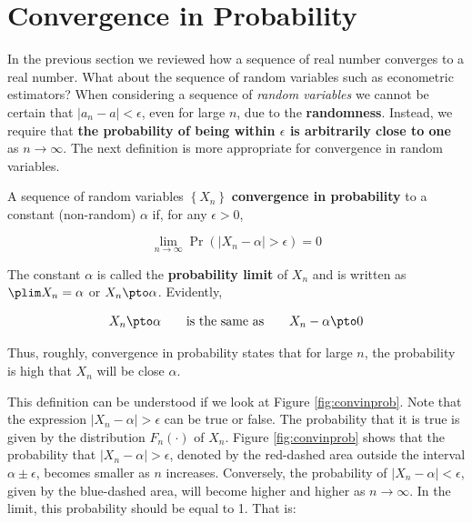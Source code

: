 \documentclass[english,12pt]{book}\usepackage[]{graphicx}\usepackage[]{xcolor}
\begin{document}
\section{Convergence in Probability}

In the previous section we reviewed how a sequence of real number converges to a real number.  What about the sequence of random variables such as econometric estimators? When considering a sequence of \emph{random variables} we cannot be certain that $\left| a_n - a\right|<\epsilon$, even for large $n$, due to the \textbf{randomness}. Instead, we require that \textbf{the probability of being within $\epsilon$ is arbitrarily close to one} as $n\to \infty$. The next definition is more appropriate for convergence in random variables. 

\begin{definition}\label{definition:convergence_in_probability}
	A sequence of random variables $\left\{X_n\right\}$ \textbf{convergence in probability} to a constant (non-random) $\alpha$ if, for any $\epsilon>0$,
	
	\begin{equation*}
	\lim_{n\to \infty} \Pr(\left|X_n-\alpha\right|>\epsilon)=0
	\end{equation*}
	
	The constant $\alpha$ is called the \textbf{probability limit} of $X_n$ and is written as $\plim X_n=\alpha$ or $X_n\pto \alpha$. Evidently,
	
	\begin{equation*}
	X_n\pto \alpha\qquad\mbox{is the same as}\qquad X_n-\alpha\pto 0
	\end{equation*}	
\end{definition}

Thus, roughly, convergence in probability states that for large $n$, the probability is high that $X_n$ will be close $\alpha$.

This definition can be understood if we look at Figure \ref{fig:convinprob}. Note that the expression $\left|X_n-\alpha\right|>\epsilon$ can be true or false. The probability that it is true is given by the distribution $F_n(\cdot)$ of $X_n$. Figure \ref{fig:convinprob} shows that the probability that $\left|X_n-\alpha\right|>\epsilon$,  denoted by the red-dashed area outside the interval $\alpha \pm \epsilon$, becomes smaller as $n$ increases. Conversely, the probability of $\left|X_n-\alpha\right|<\epsilon$, given by the blue-dashed area, will become higher and higher as $n\to \infty$. In the limit, this probability should be equal to 1. That is:
\end{document}
